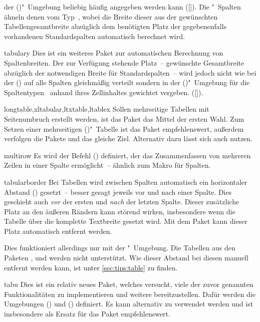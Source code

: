 \begin{packages}
  der ()"~Umgebung beliebig häufig 
  angegeben werden kann 
  ([]). 
  Die "~Spalten ähneln denen vom Typ~, 
  wobei die Breite dieser aus der gewünschten Tabellengesamtbreite abzüglich 
  dem benötigten Platz der gegebenenfalls vorhandenen Standardspalten 
  automatisch berechnet wird.
\item[tabulary]
  Dies ist ein weiteres Paket zur automatischen Berechnung von Spaltenbreiten. 
  Der zur Verfügung stehende Platz~-- gewünschte Gesamtbreite abzüglich der 
  notwendigen Breite für Standardspalten~-- wird jedoch nicht wie bei der 
  () auf alle Spalten gleichmäßig 
  verteilt sondern in der ()"~Umgebung 
  für die Spaltentypen~ anhand ihres Zellinhaltes gewichtet 
  vergeben. 
  ([]). 
\item[longtable,xltabular,ltxtable,ltablex]
  Sollen mehrseitige Tabellen mit Seitenumbruch erstellt werden, ist das Paket
   das Mittel der ersten Wahl. Zum Setzen einer mehrseitigen 
  ()"~Tabelle ist das Paket 
   empfehlenswert, außerdem verfolgen die Pakete 
   und  das gleiche Ziel. Alternativ dazu 
  lässt sich auch  nutzen.
\item[multirow]
  Es wird der Befehl () definiert, der das 
  Zusammenfassen von mehreren Zeilen in einer Spalte ermöglicht~-- ähnlich zum 
  Makro  für Spalten.
\item[tabularborder]
  Bei Tabellen wird zwischen Spalten automatisch ein horizontaler Abstand 
  () gesetzt~-- besser gesagt jeweils vor und nach einer 
  Spalte. Dies geschieht auch \emph{vor} der ersten und \emph{nach} der letzten 
  Spalte. Dieser zusätzliche Platz an den äußeren Rändern kann störend wirken, 
  insbesondere wenn die Tabelle über die komplette Textbreite gesetzt wird. Mit 
  dem Paket  kann dieser Platz automatisch entfernt 
  werden.
  
  Dies funktioniert allerdings nur mit der "~Umgebung. 
  Die Tabellen aus den Paketen ,  und 
   werden nicht unterstützt. Wie dieser Abstand bei diesen 
  manuell entfernt werden kann, ist unter \autoref{sec:tips:table} zu finden.
\item[tabu]
  Dies ist ein relativ neues Paket, welches versucht, viele der zuvor genannten 
  Funktionalitäten zu implementieren und weitere bereitzustellen. Dafür werden 
  die Umgebungen () und 
  () definiert. Es kann alternativ zu 
   verwendet werden und ist insbesondere als Ersatz für das 
  Paket  empfehlenswert.
  

\end{packages}
